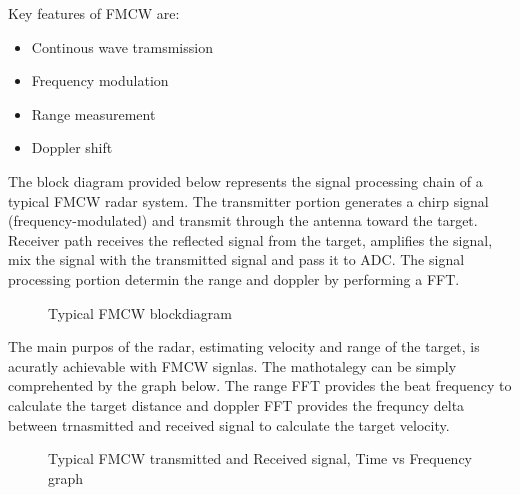 \documentclass[conference]{IEEEtran}
\begin{document}
Key features of FMCW are:
	\begin{itemize}
		\item Continous wave tramsmission
		\item Frequency modulation
		\item Range measurement
		\item Doppler shift
	\end {itemize}
	

 The block diagram provided below represents the signal processing chain of a typical FMCW radar system. The transmitter portion generates a chirp signal (frequency-modulated) and transmit through the antenna toward the target. Receiver path receives the reflected signal from the target, amplifies the signal, mix the signal with the transmitted signal and pass it to ADC. The signal processing portion determin the range and doppler by performing a FFT.

	\begin{figure}[H]
    		\centering
    		\caption{Typical FMCW blockdiagram \cite{9613183}}
	\end{figure}
	
The main purpos of the radar, estimating velocity and range of the target, is acuratly achievable with FMCW signlas. The mathotalegy can be simply comprehented by the graph below. The range FFT provides the beat frequency to calculate the target distance and doppler FFT provides the frequncy delta between trnasmitted and received signal to calculate the target velocity. 
	
	\begin{figure}[H]
    		\centering
    		\caption{Typical FMCW transmitted and Received signal, Time vs Frequency graph \cite{Long2019AssistingTV}}
	\end{figure}
	
\end{document}
